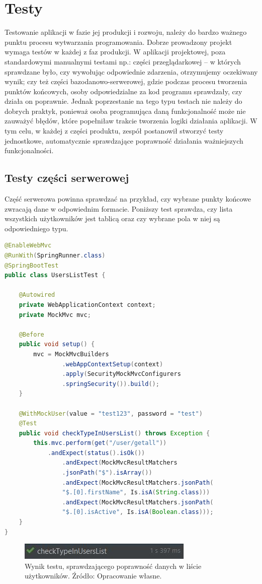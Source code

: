 \documentclass[twoside]{projektInzynierskiMS}
\numberwithin{figure}{section}
\begin{document}
\section{Testy}
Testowanie aplikacji w fazie jej produkcji i rozwoju, należy do bardzo ważnego punktu procesu wytwarzania programowania. Dobrze prowadzony projekt wymaga testów w każdej z faz produkcji. W aplikacji projektowej, poza standardowymi manualnymi testami np.: części przeglądarkowej – w których sprawdzane było, czy wywołując odpowiednie zdarzenia, otrzymujemy oczekiwany wynik; czy też części bazodanowo-serwerowej, gdzie podczas procesu tworzenia punktów końcowych, osoby odpowiedzialne za kod programu sprawdzały, czy działa on poprawnie. Jednak poprzestanie na tego typu testach nie należy do dobrych praktyk, ponieważ osoba programująca daną funkcjonalność może nie zauważyć błędów, które popełniła\linebreak w trakcie tworzenia logiki działania aplikacji. W tym celu, w każdej z części produktu, zespół postanowił stworzyć testy jednostkowe, automatycznie sprawdzające poprawność działania ważniejszych funkcjonalności.

\subsection{Testy części serwerowej}
Część serwerowa powinna sprawdzać na przykład, czy wybrane punkty końcowe zwracają dane w odpowiednim formacie. Poniższy test sprawdza, czy lista wszystkich użytkowników jest tablicą oraz czy wybrane pola w niej są odpowiedniego typu.
\begin{lstlisting}[language=Java,caption=Testy jednostkowe aplikacji przeglądarkowej. Źródło: Opracowanie własne.,captionpos=b]
@EnableWebMvc
@RunWith(SpringRunner.class)
@SpringBootTest
public class UsersListTest {

    @Autowired
    private WebApplicationContext context;
    private MockMvc mvc;

    @Before
    public void setup() {
        mvc = MockMvcBuilders
                .webAppContextSetup(context)
                .apply(SecurityMockMvcConfigurers
                .springSecurity()).build();
    }

    @WithMockUser(value = "test123", password = "test")
    @Test
    public void checkTypeInUsersList() throws Exception {
        this.mvc.perform(get("/user/getall"))
            .andExpect(status().isOk())
                .andExpect(MockMvcResultMatchers
                .jsonPath("$").isArray())
                .andExpect(MockMvcResultMatchers.jsonPath(
                "$.[0].firstName", Is.isA(String.class)))
                .andExpect(MockMvcResultMatchers.jsonPath(
                "$.[0].isActive", Is.isA(Boolean.class)));
    }
}
\end{lstlisting}
\begin{figure}[h!]
    \centering
    \includegraphics{images/testyBackend.JPG}
    \caption{Wynik testu, sprawdzającego poprawność danych w liście użytkowników. Źródło: Opracowanie własne.}
    \label{fig:testyBackend}
\end{figure}
\end{document}
